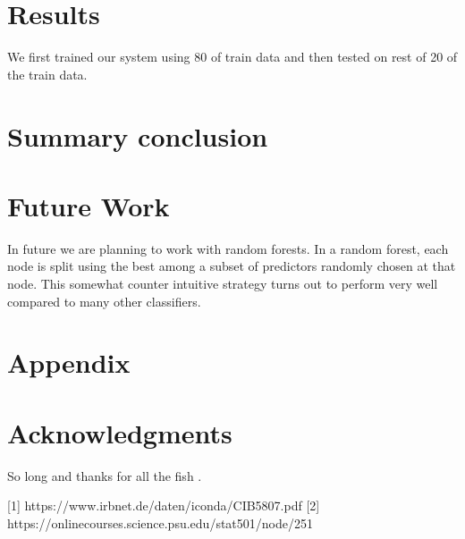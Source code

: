 \documentclass[fleqn,10pt]{SelfArx} %
\begin{document}
\section{Results}
We first trained our system using 80 of train data and then tested on rest of 20 of the train data. 
\section{Summary conclusion}
\section{Future Work}
In future we are planning to work with random forests. In a random forest, each node is split using the best among a subset of predictors randomly chosen at that node. This somewhat counter intuitive strategy turns out to perform very well compared to many other classifiers.
\section{Appendix}
\section*{Acknowledgments} %


So long and thanks for all the fish \cite{Figueredo:2009dg}.



[1] https://www.irbnet.de/daten/iconda/CIB5807.pdf
[2] https://onlinecourses.science.psu.edu/stat501/node/251
\end{document}
